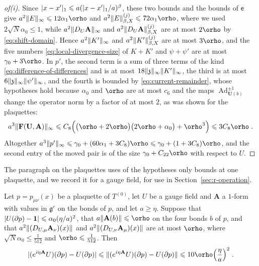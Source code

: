 \documentclass[11pt]{preprint}
\let\rho\orho
\newcommand{\id}{\mathbf 1}
\newcommand{\Ad}{\operatorname{Ad}}
\DeclarePairedDelimiter{\abs}{\lvert}{\rvert}
\DeclarePairedDelimiter{\norm}{\lVert}{\rVert}
\numberwithin{equation}{section}
\begin{document}
\begin{proof}[of(i)]
Since $\abs{x - x'}_1 \leqslant a(\abs{x - x'}_1/a)^\beta$, these two bounds and the bounds of $\mathsf e$ give $a^2\norm E_\infty \leqslant 12\alpha_1\rho$ and $a^2\norm E^{(j)}_{\beta,X} \leqslant 72\alpha_1\rho$, where we used $2\sqrt N\alpha_0 \leqslant 1$, while $a^2\norm{D_U\mathbf A}_\infty$ and $a^2\norm{D_U\mathbf A}^{(j)}_{\beta,X}$ are at most $2\rho$ by \eqref{eq:shift-domain}. Hence $a^2\norm{K'}_\infty$ and $a^2\norm{K'}^{(j)}_{\beta,X}$ are at most $3\rho$, and the five numbers \eqref{eq:local-divergence-size} of $K + K'$ and $\psi + \psi'$ are at most $\gamma_0 + 3\rho$. In $p'$, the second term is a sum of three terms of the kind \eqref{eq:difference-of-differences} and is at most $18\norm{\mathfrak z}_\infty\norm{K'}_\infty$, the third is at most $6\norm{\mathfrak z}_\infty\norm{\psi'}_\infty$, and the fourth is bounded by \eqref{eq:current-remainder}, whose hypotheses hold because $\alpha_0$ and $\rho$ are at most $c_6$ and the maps $\Ad_{\mathbf U(b)}^{\pm1}$ change the operator norm by a factor of at most $2$, as was shown for the plaquettes:
\[
    a^3\norm{\mathbf F(\mathbf U, \mathbf A)}_\infty \leqslant C_8\Bigl(\bigl(\rho + 2\rho\bigr)\bigl(2\rho + \alpha_0\bigr) + \rho^3\Bigr) \leqslant 3C_8\rho\;.
\]
Altogether $a^3\norm{p'}_\infty \leqslant \gamma_0 + (60\alpha_1 + 3C_8)\rho \leqslant \gamma_0 + (1 + 3C_8)\rho$, and the second entry of the moved pair is of the size $\gamma_0 + C_{22}\rho$ with respect to $U$.
\end{proof}

The paragraph on the plaquettes uses of the hypotheses only bounds at one plaquette, and we record it for a gauge field, for use in Section~\ref{sec:r-operation}.

\begin{corollary}\label{cor:moved-plaquette}
Let $p = p_{\mu\nu}(x)$ be a plaquette of $T^{(0)}$, let $U$ be a gauge field and $\mathbf A$ a $1$-form with values in $\mathfrak g^c$ on the bonds of $p$, and let $a \geqslant \eta$. Suppose that $\abs{U(\partial p) - \id} \leqslant \alpha_0(\eta/a)^2$, that $a\norm{\mathbf A(b)} \leqslant \rho$ on the four bonds $b$ of $p$, and that $a^2\norm{(D_{U,\mu}\mathbf A_\nu)(x)}$ and $a^2\norm{(D_{U,\nu}\mathbf A_\mu)(x)}$ are at most $\rho$, where $\sqrt N\alpha_0 \leqslant \frac{1}{512}$ and $\rho \leqslant \frac{1}{512}$. Then
\begin{equation}\label{eq:moved-gauge-plaquette}
    \abs{(e^{i\eta\mathbf A}U)(\partial p) - U(\partial p)} \leqslant \norm{(e^{i\eta\mathbf A}U)(\partial p) - U(\partial p)} \leqslant 10\rho\Bigl(\frac{\eta}{a}\Bigr)^2\;.
\end{equation}
\end{corollary}
\end{document}
